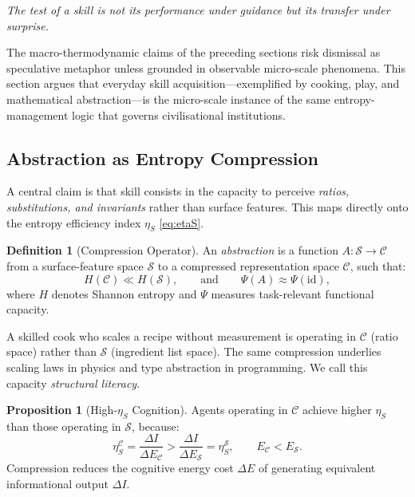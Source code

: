 \documentclass[12pt,a4paper]{article}
\theoremstyle{definition}
\newtheorem{definition}{Definition}[section]
\newtheorem{proposition}{Proposition}[section]
\begin{document}
\epigraph{\itshape The test of a skill is not its performance under guidance
  but its transfer under surprise.}{}

The macro-thermodynamic claims of the preceding sections risk dismissal as
speculative metaphor unless grounded in observable micro-scale phenomena.
This section argues that everyday skill acquisition---exemplified by cooking,
play, and mathematical abstraction---is the micro-scale instance of the same
entropy-management logic that governs civilisational institutions.

\subsection{Abstraction as Entropy Compression}

A central claim is that skill consists in the capacity to perceive \emph{ratios,
substitutions, and invariants} rather than surface features.  This maps
directly onto the entropy efficiency index $\eta_S$ \eqref{eq:etaS}.

\begin{definition}[Compression Operator]
  An \emph{abstraction} is a function $A : \mathcal{S} \to \mathcal{C}$ from
  a surface-feature space $\mathcal{S}$ to a compressed representation space
  $\mathcal{C}$, such that:
  \begin{equation}
    H(\mathcal{C}) \ll H(\mathcal{S}), \qquad
    \text{and} \qquad
    \Psi(A) \approx \Psi(\mathrm{id}),
  \end{equation}
  where $H$ denotes Shannon entropy and $\Psi$ measures task-relevant
  functional capacity.
\end{definition}

\noindent A skilled cook who scales a recipe without measurement is operating
in $\mathcal{C}$ (ratio space) rather than $\mathcal{S}$ (ingredient list
space).  The same compression underlies scaling laws in physics and type
abstraction in programming.  We call this capacity \emph{structural literacy}.

\begin{proposition}[High-$\eta_S$ Cognition]
  Agents operating in $\mathcal{C}$ achieve higher $\eta_S$ than those
  operating in $\mathcal{S}$, because:
  \begin{equation}
    \eta_S^{\mathcal{C}} = \frac{\Delta I}{\Delta E_{\mathcal{C}}}
    > \frac{\Delta I}{\Delta E_{\mathcal{S}}}
    = \eta_S^{\mathcal{S}},
    \qquad E_{\mathcal{C}} < E_{\mathcal{S}}.
  \end{equation}
  Compression reduces the cognitive energy cost $\Delta E$ of generating
  equivalent informational output $\Delta I$.
\end{proposition}
\end{document}
